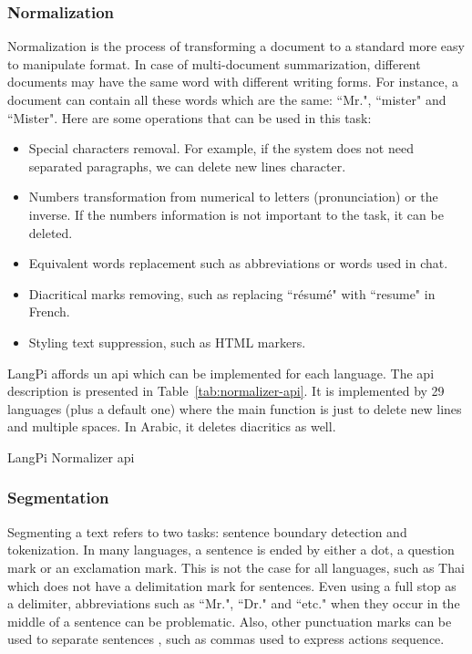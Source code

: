 \subsubsection{Normalization}

Normalization is the process of transforming a document to a standard more easy to manipulate format. 
In case of multi-document summarization, different documents may have the same word with different writing forms. 
For instance, a document can contain all these words which are the same: ``Mr.", ``mister" and ``Mister".
Here are some operations that can be used in this task:
\begin{itemize}
	\item Special characters removal. For example, if the system does not need separated paragraphs, we can delete new lines character. 
	\item Numbers transformation from numerical to letters (pronunciation) or the inverse. If the numbers information is not important to the task, it can be deleted.
	\item Equivalent words replacement such as abbreviations or words used in chat.
	\item Diacritical marks removing, such as replacing ``résumé" with ``resume" in French.
	\item Styling text suppression, such as HTML markers.
\end{itemize}

LangPi affords un \ac{api} which can be implemented for each language. 
The \ac{api} description is presented in Table~\ref{tab:normalizer-api}.
It is implemented by 29 languages (plus a default one) where the main function is just to delete new lines and multiple spaces. 
In Arabic, it deletes diacritics as well.
\begin{table}[!ht]
	\centering
	\caption{LangPi Normalizer \ac{api}}
	\label{tab:normalizer-api}
\end{table}


\subsubsection{Segmentation}

Segmenting a text refers to two tasks: sentence boundary detection and tokenization. 
In many languages, a sentence is ended by either a dot, a question mark or an exclamation mark. 
This is not the case for all languages, such as Thai which does not have a delimitation mark for sentences. 
Even using a full stop as a delimiter, abbreviations such as ``Mr.", ``Dr." and ``etc." when they occur in the middle of a sentence can be problematic. 
Also, other punctuation marks can be used to separate sentences \citep{10-palmer}, such as commas used to express actions sequence.


